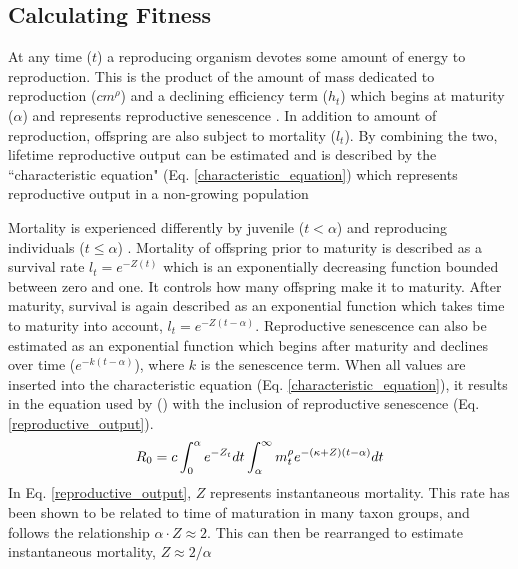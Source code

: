 \documentclass[a4paper, 11pt, hidelinks]{article} %
\begin{document}
	
	
	\subsection{Calculating Fitness}
	At any time ($ t $) a reproducing organism devotes some amount of energy to reproduction.  This is the product of the amount of mass dedicated to reproduction ($ cm^\rho $) and a declining efficiency term ($ h_t $) which begins at maturity ($ \alpha $) and represents reproductive senescence \parencite{Stearns2000, Benoit2018, Vrtilek2018}.  In addition to amount of reproduction, offspring are also subject to mortality ($ l_t $).  By combining the two, lifetime reproductive output can be estimated and is described by the ``characteristic equation" (Eq. \ref{characteristic_equation}) which represents reproductive output in a non-growing population \parencite{Roff1984, Roff1986, stearns1992evolution, roff1993, Roff2001,  Arendt2011, Tsoukali2016}

	Mortality is experienced differently by juvenile ($ t < \alpha $) and reproducing individuals ($ t \leq \alpha $) \parencite{Day1997}. 
	Mortality of offspring prior to maturity is described as a survival rate $ l_t = e^{-Z(t)} $ which is an exponentially decreasing function bounded between zero and one.  It controls how many offspring make it to maturity.  After maturity, survival is again described as an exponential function which takes time to maturity into account, $ l_t = e^{-Z(t-\alpha)} $.  
	Reproductive senescence can also be estimated as an exponential function which begins after maturity and declines over time  ($ e^{-k(t-\alpha)} $), where $ k $ is the senescence term.  When all values are inserted into the characteristic equation (Eq. \ref{characteristic_equation}), it results in the equation used by \citeauthor{Charnov2001} (\citeyear{Charnov2001}) with the inclusion of reproductive senescence (Eq. \ref{reproductive_output}).
	\begin{equation}
		\label{reproductive_output}
		R_0 = c\int_0^\alpha e^{-Z_t} dt  \int_\alpha^\infty m_t^\rho e^{-(\kappa + Z)(t - \alpha)}dt\\
	\end{equation} 
	In Eq. \ref{reproductive_output}, $ Z $ represents instantaneous mortality.  This rate has been shown to be related to time of maturation in many taxon groups, and follows the relationship $ \alpha \cdot Z \approx  2$.  This can then be rearranged to estimate instantaneous mortality, $ Z \approx 2/\alpha  $
	
\end{document}

